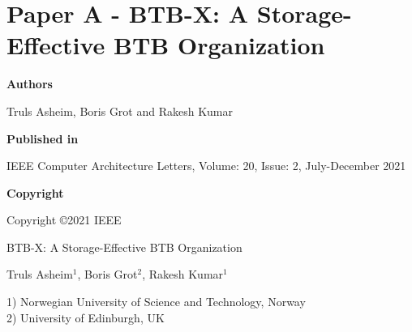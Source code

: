 \documentclass[../../../main.tex]{subfiles}
\begin{document}
\chapter{Paper A - BTB-X: A Storage-Effective BTB Organization}

\noindent \textbf{Authors}

\vspace*{0.3cm}

\noindent Truls Asheim, Boris Grot and Rakesh Kumar

\vspace*{0.7cm}

\noindent \textbf{Published in}

\vspace*{0.3cm}

\noindent IEEE Computer Architecture Letters, Volume: 20, Issue: 2, July-December 2021

\vspace*{0.7cm}

\noindent \textbf{Copyright}

\vspace*{0.3cm}

\noindent Copyright ©2021 IEEE

\newpage

\vspace*{0.1cm}

\begin{center}

\Huge{BTB-X: A Storage-Effective BTB Organization}

\vspace{0.6cm}

\large{Truls Asheim$^{1}$, Boris Grot$^{2}$, Rakesh Kumar$^{1}$}

\vspace{0.1cm}

\small{1) Norwegian University of Science and Technology, Norway}\\
\small{2) University of Edinburgh, UK}


\end{center}

\vspace{0.2cm}
\end{document}
